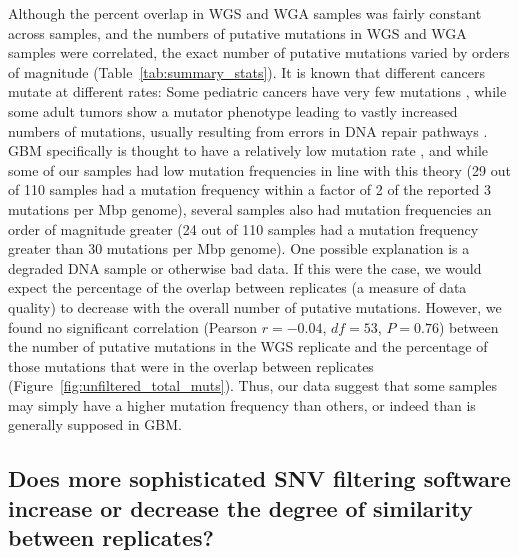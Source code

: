 \documentclass[11 pt]{article} %
\begin{document}
Although the percent overlap in WGS and WGA samples was fairly constant across samples, and the numbers of putative mutations in WGS and WGA samples were correlated, the exact number of putative mutations varied by orders of magnitude (Table~\ref{tab:summary_stats}). It is known that different cancers mutate at different rates: Some pediatric cancers have very few mutations \citep{RB2hit, pediatric}, while some adult tumors show a mutator phenotype leading to vastly increased numbers of mutations, usually resulting from errors in DNA repair pathways \citep{mutator}. GBM specifically is thought to have a relatively low mutation rate \citep{Parsons, TCGA-GBM-13}, and while some of our samples had low mutation frequencies in line with this theory (29 out of 110 samples had a mutation frequency within a factor of 2 of the reported 3 mutations per Mbp genome), several samples also had mutation frequencies an order of magnitude greater (24 out of 110 samples had a mutation frequency greater than 30 mutations per Mbp genome). One possible explanation is a degraded DNA sample or otherwise bad data. If this were the case, we would expect the percentage of the overlap between replicates (a measure of data quality) to decrease with the overall number of putative mutations. However, we found no significant correlation (Pearson $r=-0.04$, $df=53$, $P=0.76$) between the number of putative mutations in the WGS replicate and the percentage of those mutations that were in the overlap between replicates (Figure~\ref{fig:unfiltered_total_muts}). Thus, our data suggest that some samples may simply have a higher mutation frequency than others, or indeed than is generally supposed in GBM.

\subsection*{Does more sophisticated SNV filtering software increase or decrease the degree of similarity between replicates?}
\end{document}
